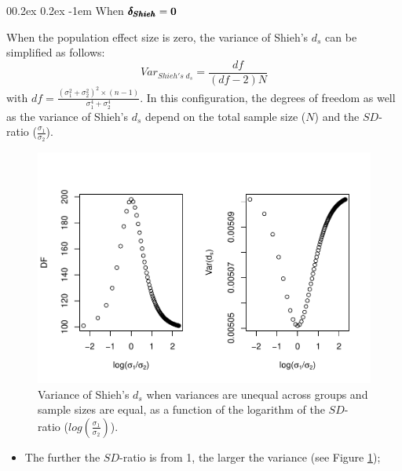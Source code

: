 \documentclass[
  english,
  man]{apa6}
\makeatletter
\providecommand{\tightlist}{%
  \setlength{\itemsep}{0pt}\setlength{\parskip}{0pt}}
\let\oldparagraph\paragraph
\renewcommand{\paragraph}[1]{\oldparagraph{#1}\mbox{}}
\renewcommand{\paragraph}{\@startsection{paragraph}{4}{\parindent}%
  {0\baselineskip \@plus 0.2ex \@minus 0.2ex}%
  {-1em}%
  {\normalfont\normalsize\bfseries\itshape\typesectitle}}
\makeatother
\begin{document}
\hypertarget{when-bf-pmbdelta_shieh0-1}{%
\paragraph{\texorpdfstring{When \(\bf \pmb{\delta_{Shieh}}=0\)}{When \textbackslash bf \textbackslash pmb\{\textbackslash delta\_\{Shieh\}\}=0}}\label{when-bf-pmbdelta_shieh0-1}}

When the population effect size is zero, the variance of Shieh's \(d_s\) can be simplified as follows:
\[Var_{Shieh's \; d_s} = \frac{df}{(df-2)N}\]
with \(df = \frac{(\sigma_1^2+\sigma_2^2)^2 \times (n-1)}{\sigma_1^4+\sigma_2^4}\). In this configuration, the degrees of freedom as well as the variance of Shieh's \(d_s\) depend on the total sample size (\(N\)) and the \(SD\)-ratio (\(\frac{\sigma_1}{\sigma_2}\)).

\begin{figure}
\centering
\includegraphics{Theoretical-Variance-of-all-estimators-as-a-function-of-population-parameters_files/figure-latex/varshiehhetbalSDratio2-1.pdf}
\caption{\label{fig:varshiehhetbalSDratio2}Variance of Shieh's \(d_s\) when variances are unequal across groups and sample sizes are equal, as a function of the logarithm of the \(SD\)-ratio (\(log \left( \frac{\sigma_1}{\sigma_2} \right)\)).}
\end{figure}

\begin{itemize}
\tightlist
\item
  The further the \(SD\)-ratio is from 1, the larger the variance (see Figure \ref{fig:varshiehhetbalSDratio2});
\end{itemize}
\end{document}
